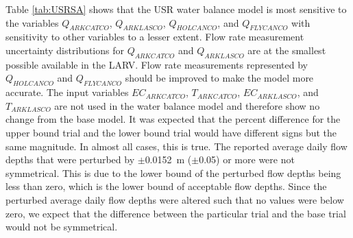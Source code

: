 \begin{linenumbers}
Table \ref{tab:USRSA} shows that the USR water balance model is most sensitive to the variables $ Q_{ARKCATCO} $, $ Q_{ARKLASCO} $, $ Q_{HOLCANCO} $, and $ Q_{FLYCANCO} $ with sensitivity to other variables to a lesser extent.  Flow rate measurement uncertainty distributions for $ Q_{ARKCATCO} $ and $ Q_{ARKLASCO} $ are at the smallest possible available in the LARV.  Flow rate measurements represented by $ Q_{HOLCANCO} $ and $ Q_{FLYCANCO} $ should be improved to make the model more accurate.  The input variables $ EC_{ARKCATCO} $, $ T_{ARKCATCO} $, $ EC_{ARKLASCO} $, and $ T_{ARKLASCO} $ are not used in the water balance model and therefore show no change from the base model.  It was expected that the percent difference for the upper bound trial and the lower bound trial would have different signs but the same magnitude.  In almost all cases, this is true.  The reported average daily flow depths that were perturbed by $\pm$\SI{0.0152}{\meter} ($\pm$\SI{0.05}{\foot}) or more were not symmetrical.  This is due to the lower bound of the perturbed flow depths being less than zero, which is the lower bound of acceptable flow depths.  Since the perturbed average daily flow depths were altered such that no values were below zero, we expect that the difference between the particular trial and the base trial would not be symmetrical.


\end{linenumbers}
